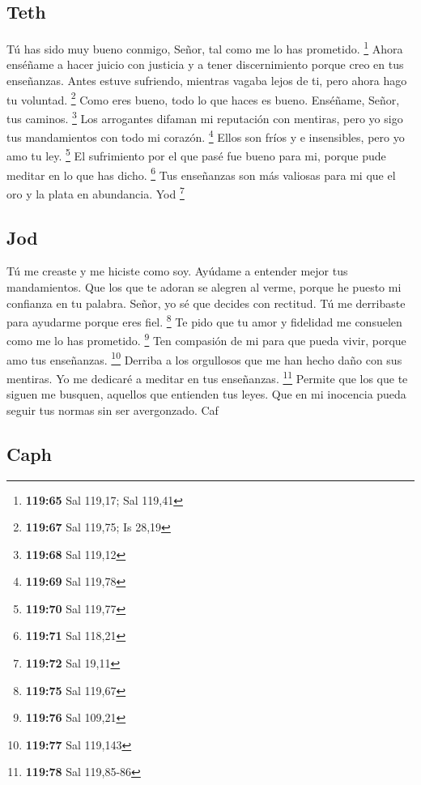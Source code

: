 \hypertarget{teth}{%
\subsection{Teth}\label{teth}}

 Tú has sido muy bueno conmigo, Señor, tal como me lo has
prometido. \footnote{\textbf{119:65} Sal 119,17; Sal 119,41}
 Ahora enséñame a hacer juicio con justicia y a tener
discernimiento porque creo en tus enseñanzas.  Antes estuve
sufriendo, mientras vagaba lejos de ti, pero ahora hago tu voluntad.
\footnote{\textbf{119:67} Sal 119,75; Is 28,19}  Como eres
bueno, todo lo que haces es bueno. Enséñame, Señor, tus caminos.
\footnote{\textbf{119:68} Sal 119,12}  Los arrogantes
difaman mi reputación con mentiras, pero yo sigo tus mandamientos con
todo mi corazón. \footnote{\textbf{119:69} Sal 119,78} 
Ellos son fríos y e insensibles, pero yo amo tu ley. \footnote{\textbf{119:70}
  Sal 119,77}  El sufrimiento por el que pasé fue bueno
para mi, porque pude meditar en lo que has dicho. \footnote{\textbf{119:71}
  Sal 118,21}  Tus enseñanzas son más valiosas para mi que
el oro y la plata en abundancia. Yod \footnote{\textbf{119:72} Sal 19,11}

\hypertarget{jod}{%
\subsection{Jod}\label{jod}}

 Tú me creaste y me hiciste como soy. Ayúdame a entender
mejor tus mandamientos.  Que los que te adoran se alegren
al verme, porque he puesto mi confianza en tu palabra. 
Señor, yo sé que decides con rectitud. Tú me derribaste para ayudarme
porque eres fiel. \footnote{\textbf{119:75} Sal 119,67}  Te
pido que tu amor y fidelidad me consuelen como me lo has prometido.
\footnote{\textbf{119:76} Sal 109,21}  Ten compasión de mi
para que pueda vivir, porque amo tus enseñanzas. \footnote{\textbf{119:77}
  Sal 119,143}  Derriba a los orgullosos que me han hecho
daño con sus mentiras. Yo me dedicaré a meditar en tus enseñanzas.
\footnote{\textbf{119:78} Sal 119,85-86}  Permite que los
que te siguen me busquen, aquellos que entienden tus leyes.
 Que en mi inocencia pueda seguir tus normas sin ser
avergonzado. Caf

\hypertarget{caph}{%
\subsection{Caph}\label{caph}}

